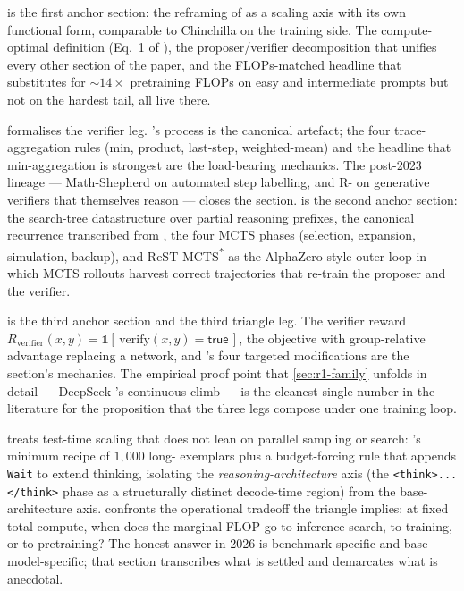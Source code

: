  is the first anchor section: the
\citet{snell2024} reframing of  as a scaling axis with
its own functional form, comparable to Chinchilla on the training
side. The compute-optimal definition (Eq.~1 of
\citet{snell2024}), the proposer/verifier decomposition that unifies
every other section of the paper, and the FLOPs-matched headline that
 substitutes for $\sim\!14\times$ pretraining FLOPs on
easy and intermediate prompts but not on the hardest tail, all live
there.

 formalises the verifier leg.
\citet{lightman2023-prm800k}'s process  is the canonical
artefact; the four trace-aggregation rules (min, product, last-step,
weighted-mean) and the headline that min-aggregation is strongest are
the load-bearing mechanics. The post-2023  lineage --- Math-Shepherd
on automated step labelling,  and R- on generative
verifiers that themselves reason --- closes the section.
 is the second anchor section: the search-tree
datastructure over partial reasoning prefixes, the canonical 
recurrence transcribed from \citet{rstar-math2025}, the four MCTS
phases (selection, expansion, simulation, backup), and ReST-MCTS\textsuperscript{*}
as the AlphaZero-style outer loop in which MCTS rollouts harvest
correct trajectories that re-train the proposer and the verifier.

 is the third anchor section and the third
triangle leg. The verifier reward
$R_\mathrm{verifier}(x,y) = \mathbb{1}[\,\mathrm{verify}(x,y) =
\mathsf{true}\,]$, the  objective \citep[\S 4.1]{shao2024} with
group-relative advantage replacing a  network, and 's four
targeted modifications \citep[\S 2]{dapo2025} are the section's
mechanics. The empirical proof point that \cref{sec:r1-family} unfolds
in detail --- DeepSeek-'s continuous  climb --- is the
cleanest single number in the literature for the proposition that the
three legs compose under one training loop.

 treats test-time scaling that does not lean
on parallel sampling or search: \citet{s1-2025}'s minimum recipe of
$1{,}000$ long- exemplars plus a budget-forcing rule that appends
\texttt{Wait} to extend thinking, isolating the
\emph{reasoning-architecture} axis (the \texttt{<think>...</think>}
phase as a structurally distinct decode-time region) from the
base-architecture axis.  confronts the
operational tradeoff the triangle implies: at fixed total compute,
when does the marginal FLOP go to inference search, to  training,
or to pretraining? The honest answer in 2026 is benchmark-specific and
base-model-specific; that section transcribes what is settled and
demarcates what is anecdotal.

